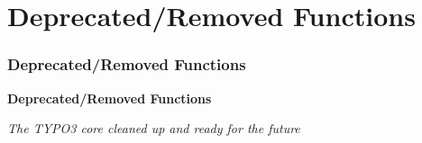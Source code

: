 %

\section{Deprecated/Removed Functions}
\begin{frame}[fragile]
	\frametitle{Deprecated/Removed Functions}

	\begin{center}\huge{\color{typo3darkgrey}\textbf{Deprecated/Removed Functions}}\end{center}
	\begin{center}\large{\textit{The TYPO3 core cleaned up and ready for the future}}\end{center}

\end{frame}


